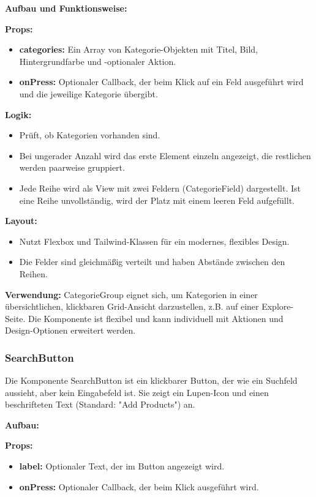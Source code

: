 \documentclass[12pt, a4paper]{report} %
\begin{document}
\noindent\textbf{Aufbau und Funktionsweise:}

\textbf{Props:}
\begin{itemize}
    \item \textbf{categories:} Ein Array von Kategorie-Objekten mit Titel, Bild, Hintergrundfarbe und -optionaler Aktion.
    \item \textbf{onPress:} Optionaler Callback, der beim Klick auf ein Feld ausgeführt wird und die jeweilige Kategorie übergibt.
\end{itemize}

\textbf{Logik:}
\begin{itemize}
    \item Prüft, ob Kategorien vorhanden sind.
    \item Bei ungerader Anzahl wird das erste Element einzeln angezeigt, die restlichen werden paarweise gruppiert.
    \item Jede Reihe wird als View mit zwei Feldern (CategorieField) dargestellt. Ist eine Reihe unvollständig, wird der Platz mit einem leeren Feld aufgefüllt.
\end{itemize}

\textbf{Layout:}
\begin{itemize}
    \item Nutzt Flexbox und Tailwind-Klassen für ein modernes, flexibles Design.
    \item Die Felder sind gleichmäßig verteilt und haben Abstände zwischen den Reihen.
\end{itemize}

\noindent\textbf{Verwendung:} CategorieGroup eignet sich, um Kategorien in einer übersichtlichen, klickbaren Grid-Ansicht darzustellen, z.B. auf einer Explore-Seite. Die Komponente ist flexibel und kann individuell mit Aktionen und Design-Optionen erweitert werden.

\subsubsection{SearchButton}
Die Komponente SearchButton ist ein klickbarer Button, der wie ein Suchfeld aussieht, aber kein Eingabefeld ist. Sie zeigt ein Lupen-Icon und einen beschrifteten Text (Standard: "Add Products") an.

\noindent\textbf{Aufbau:}

\textbf{Props:}
\begin{itemize}
    \item \textbf{label:} Optionaler Text, der im Button angezeigt wird.
    \item \textbf{onPress:} Optionaler Callback, der beim Klick ausgeführt wird.
\end{itemize}
\end{document}
